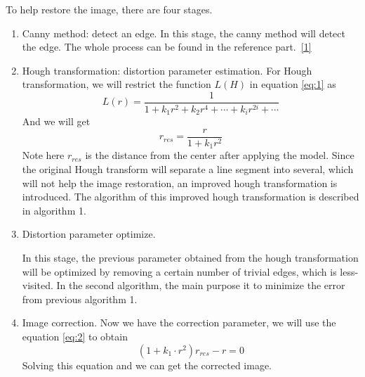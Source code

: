 \documentclass{article}
\begin{document}
To help restore the image, there are four stages. 
\begin{enumerate}[1.]
\item Canny method: detect an edge.\newline
In this stage, the canny method will detect the edge. The whole process can be found in the reference part.~\hyperref[canny]{[1]}
\item Hough transformation: distortion parameter estimation.\newline
For Hough transformation, we will restrict the function $L(H)$ in equation \ref{eq:1} as 
\[
	L(r) = \frac{1}{1+k_1r^2+k_2r^4+\cdots +k_ir^{2i}+\cdots}
\]	
And we will get 
\begin{equation}\label{eq:2}
	r_{res} = \frac{r}{1+k_1r^2}
\end{equation}
Note here $r_{res}$ is the distance from the center after applying the model. Since the original Hough transform will separate a line segment into several, which will not help the image restoration, an improved hough transformation is introduced. The algorithm of this improved hough transformation is described in algorithm 1.
\item Distortion parameter optimize.

In this stage, the previous parameter obtained from the hough transformation will be optimized by removing a certain number of trivial edges, which is less-visited. In the second algorithm, the main purpose it to minimize the error from previous algorithm 1.

\item Image correction.
Now we have the correction parameter, we will use the equation \ref{eq:2} to obtain \[
	(1+k_1\cdot r^2)r_{res} - r = 0
\]
Solving this equation and we can get the corrected image. 
\end{enumerate}
\end{document}
